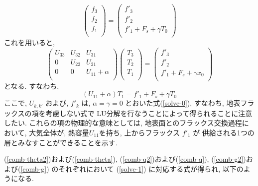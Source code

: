 %
\begin{equation}
  \left( \begin{array}{l}
         f_3 \\ f_2 \\ f_1 \\
         \end{array} \right)
 = 
  \left( \begin{array}{l}
         f'_3 \\ f'_2 \\ f'_1 + F_s + \gamma T_0 \\
         \end{array} \right)
\end{equation}
%
これを用いると,
%
\begin{equation}
  \left( \begin{array}{lll}
         U_{33} & U_{32} & U_{31} \\
         0      & U_{22} & U_{21} \\
         0      & 0      & U_{11} + \alpha \\
         \end{array} \right)
  \left( \begin{array}{l}
         T_3 \\ T_2 \\ T_1 \\
         \end{array} \right)
  = 
  \left(  \begin{array}{l}
          f'_3 \\ f'_2 \\ f'_1 + F_s + \gamma x_0 \\
          \end{array} \right)
 \label{solve-x}
\end{equation}
%
となる. すなわち,
%
\begin{equation}
  ( U_{11} +  \alpha  ) T_1 = f'_1 + F_s + \gamma T_0 
  \label{solve-1}
\end{equation}
%
ここで, $U_{k,k'}$ および, $f'_k$ は,
$\alpha=\gamma=0$ とおいた式(\ref{solve-0}),
すなわち, 地表フラックスの項を考慮しない式で
LU分解を行なうことによって得られることに注意したい.
これらの項の物理的な意味としては,
地表面とのフラックス交換過程において,
大気全体が, 熱容量$U_{11}$を持ち, 
上からフラックス $f'_1$ が
供給される1つの層とみなすことができることを示す.

(\ref{comb-theta2})および(\ref{comb-theta}), 
(\ref{comb-q2})および(\ref{comb-q}), 
(\ref{comb-g2})および(\ref{comb-g})  のそれぞれにおいて
(\ref{solve-1}) に対応する式が得られ, 以下のようになる.

